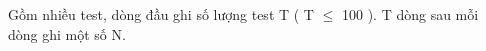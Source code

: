Gồm nhiều test, dòng đầu ghi số lượng test T ( T $\le$ 100 ). T dòng sau mỗi dòng ghi một số N.  

\
